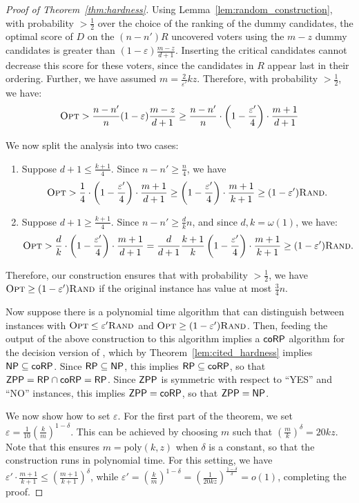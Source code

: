 \begin{proof}[Proof of Theorem~\ref{thm:hardness}]
Using Lemma~\ref{lem:random_construction}, with probability $> \frac{1}{2}$ over the choice of the ranking of the dummy candidates, the optimal score of $D$ on the $(n-n')R$ uncovered voters using the $m-z$ dummy candidates is greater than $(1-\varepsilon) \frac{m - z}{d + 1}$. Inserting the critical candidates cannot decrease this score for these voters, since the candidates in $R$ appear last in their ordering. Further, we have assumed $m = \frac{2}{\varepsilon'} k z$. Therefore, with probability $> \frac{1}{2}$, we have:
    $$ {\normalfont\textsc{Opt}} > \frac{n - n'}{n} (1-\varepsilon) \frac{m - z}{d + 1} \ge \frac{n - n'}{n} \cdot \left(1 - \frac{\varepsilon'}{4}\right) \cdot \frac{m + 1}{d + 1}$$

We now split the analysis into two cases:

\begin{enumerate}
    \item Suppose $d + 1 \le \frac{k+1}{4}$. Since $n - n' \ge \frac{n}{4}$, we have 
    \[
    {\normalfont\textsc{Opt}} > \frac{1}{4} \cdot \left(1 - \frac{\varepsilon'}{4}\right) \cdot \frac{m + 1}{d + 1} \ge \left(1 - \frac{\varepsilon'}{4}\right) \cdot \frac{m + 1}{k + 1} \ge  (1-\varepsilon') {\normalfont\textsc{Rand}}.
    \]
    \item Suppose $d + 1 \ge \frac{k+1}{4}$. Since $n - n' \ge \frac{d}{k} n$, and since $d,k = \omega(1)$, we have:
    \[
    {\normalfont\textsc{Opt}} > \frac{d}{k} \cdot \left(1 - \frac{\varepsilon'}{4}\right) \cdot \frac{m + 1}{d+1} = \frac{d}{d+1}\frac{k+1}{k} \left(1 - \frac{\varepsilon'}{4}\right) \cdot \frac{m + 1}{k+1} \ge (1-\varepsilon') {\normalfont\textsc{Rand}}.
    \]
\end{enumerate}

Therefore, our construction ensures that with probability $> \frac{1}{2}$, we have ${\normalfont\textsc{Opt}} \ge (1-\varepsilon') {\normalfont\textsc{Rand}}$ if the original \rc{} instance has value at most $\frac{3}{4} n$.

Now suppose there is a polynomial time algorithm that can distinguish between instances with ${\normalfont\textsc{Opt}} \le \varepsilon' {\normalfont\textsc{Rand}}$ and ${\normalfont\textsc{Opt}} \ge (1-\varepsilon') {\normalfont\textsc{Rand}}$. Then, feeding the output of the above construction to this algorithm implies a $\mathsf{coRP}$ algorithm for the decision version of \rc, which by Theorem~\ref{lem:cited_hardness} implies $\mathsf{NP} \subseteq \mathsf{coRP}$. Since $\mathsf{RP} \subseteq \mathsf{NP}$, this implies $\mathsf{RP} \subseteq \mathsf{coRP}$, so that $\mathsf{ZPP} = \mathsf{RP} \cap \mathsf{coRP} = \mathsf{RP}$. Since $\mathsf{ZPP}$ is symmetric with respect to ``YES'' and ``NO'' instances, this implies $\mathsf{ZPP} = \mathsf{coRP}$, so that $\mathsf{ZPP} = \mathsf{NP}$. 

We now show how to set $\varepsilon$. For the first part of the theorem, we set $\varepsilon = \frac{1}{10} \left( \frac{k}{m} \right)^{1-\delta}$. This can be achieved by choosing $m$ such that $\left(\frac{m}{k}\right)^{\delta} = 20 k z$. Note that this ensures $m = \mbox{poly}(k,z)$ when $\delta$ is a constant, so that the construction runs in polynomial time. For this setting, we have $\varepsilon' \cdot \frac{m+1}{k+1} \le \left( \frac{m+1}{k+1} \right)^{\delta}$, while  $\varepsilon' = \left( \frac{k}{m} \right)^{1-\delta} = \left( \frac{1}{20kz} \right)^{\frac{1-\delta}{\delta}} = o(1)$, completing the proof.


\end{proof}
